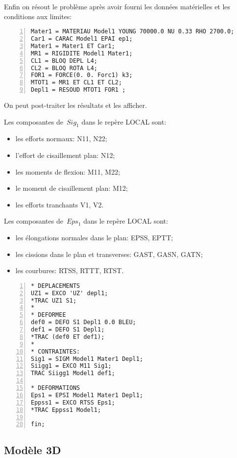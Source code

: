 \medskip
Enfin on résout le problème après avoir fourni les données matérielles et les conditions aux limites:

\scriptsize
\begin{Verbatim}[numbers=left,numbersep=3pt,firstnumber=last]
Mater1 = MATERIAU Model1 YOUNG 70000.0 NU 0.33 RHO 2700.0;
Car1 = CARAC Model1 EPAI ep1;
Mater1 = Mater1 ET Car1;
MR1 = RIGIDITE Model1 Mater1;
CL1 = BLOQ DEPL L4;
CL2 = BLOQ ROTA L4;
FOR1 = FORCE(0. 0. Forc1) k3;
MTOT1 = MR1 ET CL1 ET CL2;
Depl1 = RESOUD MTOT1 FOR1 ;
\end{Verbatim}
\normalsize

\medskip
On peut post-traiter les résultats et les afficher.

Les composantes de~$Sig_1$ dans le repère LOCAL sont:
\begin{itemize}
  \item les efforts normaux: N11, N22;
  \item l'effort de cisaillement plan: N12; 
  \item les moments de flexion: M11, M22;
  \item le moment de cisaillement plan: M12;
  \item les efforts tranchants V1, V2.
\end{itemize}

Les composantes de~$Eps_1$ dans le repère LOCAL sont:
\begin{itemize}
  \item les élongations normales dans le plan: EPSS, EPTT;
  \item les cissions dans le plan et transverses: GAST, GASN, GATN;
  \item les courbures: RTSS, RTTT, RTST.
\end{itemize}

\scriptsize
\begin{Verbatim}[numbers=left,numbersep=3pt,firstnumber=last]
* DEPLACEMENTS
UZ1 = EXCO 'UZ' depl1;
*TRAC UZ1 S1;
*
* DEFORMEE
def0 = DEFO S1 Depl1 0.0 BLEU;
def1 = DEFO S1 Depl1;
*TRAC (def0 ET def1);
*
* CONTRAINTES: 
Sig1 = SIGM Model1 Mater1 Depl1;
Siigg1 = EXCO M11 Sig1;
TRAC Siigg1 Model1 def1;

* DEFORMATIONS
Eps1 = EPSI Model1 Mater1 Depl1;
Eppss1 = EXCO RTSS Eps1;
*TRAC Eppss1 Model1;

fin;
\end{Verbatim}
\normalsize


\medskip
\subsection{Modèle 3D}

